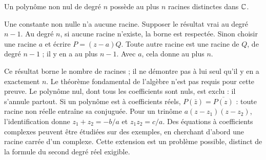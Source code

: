 \begin{theoreme}
Un polynôme non nul de degré $n$ possède au plus $n$ racines distinctes dans $\mathbb{C}$.
\end{theoreme}
\begin{demonstration}
Une constante non nulle n'a aucune racine. Supposer le résultat vrai au degré $n-1$.
Au degré $n$, si aucune racine n'existe, la borne est respectée. Sinon choisir une racine $a$ et écrire $P=(z-a)Q$.
Toute autre racine est une racine de $Q$, de degré $n-1$ ; il y en a au plus $n-1$. Avec $a$, cela donne au plus $n$.
\end{demonstration}
Ce résultat borne le nombre de racines ; il ne démontre pas à lui seul qu'il y en a exactement $n$. Le théorème fondamental de l'algèbre n'est pas requis pour cette preuve.
Le polynôme nul, dont tous les coefficients sont nuls, est exclu : il s'annule partout.
Si un polynôme est à coefficients réels, $P(\bar z)=\overline{P(z)}$ : toute racine non réelle entraîne sa conjuguée.
Pour un trinôme $a(z-z_1)(z-z_2)$, l'identification donne $z_1+z_2=-b/a$ et $z_1z_2=c/a$.
Des équations à coefficients complexes peuvent être étudiées sur des exemples, en cherchant d'abord une racine carrée d'un complexe. Cette extension est un problème possible, distinct de la formule du second degré réel exigible.

